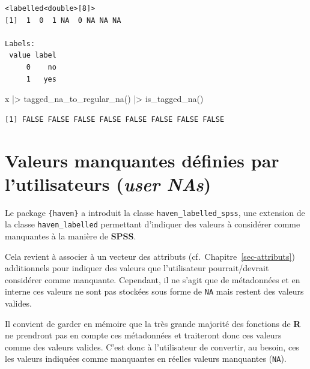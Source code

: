 \documentclass[
  letterpaper,
  DIV=11,
  numbers=noendperiod,
  oneside]{scrreprt}
\newenvironment{Shaded}{\begin{snugshade}}{\end{snugshade}}
\newcommand{\FunctionTok}[1]{\textcolor[rgb]{0.28,0.35,0.67}{#1}}
\newcommand{\NormalTok}[1]{\textcolor[rgb]{0.00,0.23,0.31}{#1}}
\newcommand{\SpecialCharTok}[1]{\textcolor[rgb]{0.37,0.37,0.37}{#1}}
\begin{document}
\begin{verbatim}
<labelled<double>[8]>
[1]  1  0  1 NA  0 NA NA NA

Labels:
 value label
     0    no
     1   yes
\end{verbatim}

\begin{Shaded}
\begin{Highlighting}[]
\NormalTok{x }\SpecialCharTok{|\textgreater{}} 
  \FunctionTok{tagged\_na\_to\_regular\_na}\NormalTok{() }\SpecialCharTok{|\textgreater{}}
  \FunctionTok{is\_tagged\_na}\NormalTok{()}
\end{Highlighting}
\end{Shaded}

\begin{verbatim}
[1] FALSE FALSE FALSE FALSE FALSE FALSE FALSE FALSE
\end{verbatim}

\hypertarget{sec-user-na}{%
\section{\texorpdfstring{Valeurs manquantes définies par l'utilisateurs
(\emph{user
NAs})}{Valeurs manquantes définies par l'utilisateurs (user NAs)}}\label{sec-user-na}}

Le package \texttt{\{haven\}} a introduit la classe
\texttt{haven\_labelled\_spss}, une extension de la classe
\texttt{haven\_labelled} permettant d'indiquer des valeurs à considérer
comme manquantes à la manière de \textbf{SPSS}.

\begin{tcolorbox}[enhanced jigsaw, colbacktitle=quarto-callout-important-color!10!white, opacityback=0, toprule=.15mm, colback=white, coltitle=black, bottomtitle=1mm, toptitle=1mm, titlerule=0mm, rightrule=.15mm, title=\textcolor{quarto-callout-important-color}{\faExclamation}\hspace{0.5em}{Important}, breakable, bottomrule=.15mm, opacitybacktitle=0.6, arc=.35mm, left=2mm, leftrule=.75mm, colframe=quarto-callout-important-color-frame]

Cela revient à associer à un vecteur des attributs
(cf.~Chapitre~\ref{sec-attributs}) additionnels pour indiquer des
valeurs que l'utilisateur pourrait/devrait considérer comme manquante.
Cependant, il ne s'agit que de métadonnées et en interne ces valeurs ne
sont pas stockées sous forme de \texttt{NA} mais restent des valeurs
valides.

Il convient de garder en mémoire que la très grande majorité des
fonctions de \textbf{R} ne prendront pas en compte ces métadonnées et
traiteront donc ces valeurs comme des valeurs valides. C'est donc à
l'utilisateur de convertir, au besoin, ces les valeurs indiquées comme
manquantes en réelles valeurs manquantes (\texttt{NA}).

\end{tcolorbox}
\end{document}
